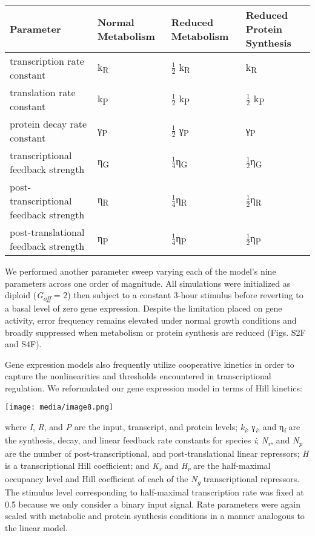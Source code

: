 \begin{longtable}[]{@{}llll@{}}
\toprule
\textbf{Parameter} & \textbf{Normal Metabolism} & \textbf{Reduced Metabolism} & \textbf{Reduced Protein Synthesis}\tabularnewline
\midrule
\endhead
transcription rate constant & k\textsubscript{R} & \(\frac{1}{2}\) k\textsubscript{R} & k\textsubscript{R}\tabularnewline
translation rate constant & k\textsubscript{P} & \(\frac{1}{2}\) k\textsubscript{P} & \(\frac{1}{2}\) k\textsubscript{P}\tabularnewline
protein decay rate constant & γ\textsubscript{P} & \(\frac{1}{2}\) γ\textsubscript{P} & γ\textsubscript{P}\tabularnewline
transcriptional feedback strength & η\textsubscript{G} & \(\frac{1}{4}\)η\textsubscript{G} & \(\frac{1}{2}\)η\textsubscript{G}\tabularnewline
post-transcriptional feedback strength & η\textsubscript{R} & \(\frac{1}{4}\)η\textsubscript{R} & \(\frac{1}{2}\)η\textsubscript{R}\tabularnewline
post-translational feedback strength & η\textsubscript{P} & \(\frac{1}{4}\)η\textsubscript{P} & \(\frac{1}{2}\)η\textsubscript{P}\tabularnewline
\bottomrule
\end{longtable}

We performed another parameter sweep varying each of the model's nine parameters across one order of magnitude. All simulations were initialized as diploid (\textit{G\textsubscript{off}} = 2) then subject to a constant 3-hour stimulus before reverting to a basal level of zero gene expression. Despite the limitation placed on gene activity, error frequency remains elevated under normal growth conditions and broadly suppressed when metabolism or protein synthesis are reduced (Figs. S2F and S4F).

Gene expression models also frequently utilize cooperative kinetics in order to capture the nonlinearities and thresholds encountered in transcriptional regulation. We reformulated our gene expression model in terms of Hill kinetics:

\texttt{[image: media/image8.png]}

where \textit{I}, \textit{R}, and \textit{P} are the input, transcript, and protein levels; \textit{k\textsubscript{i}}, γ\textit{\textsubscript{i}}, and η\textit{\textsubscript{i}} are the synthesis, decay, and linear feedback rate constants for species \textit{i}; \textit{N\textsubscript{r}}, and \textit{N\textsubscript{p}} are the number of post-transcriptional, and post-translational linear repressors; \textit{H} is a transcriptional Hill coefficient; and \textit{K\textsubscript{r}} and \textit{H\textsubscript{r}} are the half-maximal occupancy level and Hill coefficient of each of the \textit{N\textsubscript{g}} transcriptional repressors. The stimulus level corresponding to half-maximal transcription rate was fixed at 0.5 because we only consider a binary input signal. Rate parameters were again scaled with metabolic and protein synthesis conditions in a manner analogous to the linear model.

